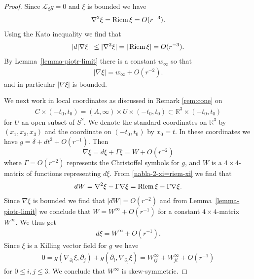 \documentclass[a4paper,11pt,reqno]{amsart}
\newcommand{\Reals}{\mathbb{R}}
\newcommand{\Riem}{\mathop{\rm Riem}}
\theoremstyle{plain}
\newcommand{\Lie}{\mathcal{L}}
\numberwithin{equation}{section}
\begin{document}
\begin{proof}

Since $\Lie_\xi g = 0$ and $\xi$ is bounded we have 
\begin{equation} \label{nabla-2-xi=riem-xi}
\nabla^2 \xi = \Riem \xi = O(r^{-3}).
\end{equation}
Using the Kato inequality we find that 
\begin{align} 
|d |\nabla \xi| | \leq |\nabla^2 \xi| = |\Riem \xi| = O(r^{-3}).
\end{align} 
By Lemma~\ref{lemma-piotr-limit} there is a constant $w_\infty$ so that
\begin{align} 
|\nabla \xi| = w_\infty + O(r^{-2}).
\end{align} 
and in particular $|\nabla \xi|$ is bounded.

We next work in local coordinates as discussed in Remark \ref{rem:cone} on 
\begin{align}
C \times (-t_0,t_0) = (A, \infty) \times U \times (-t_0,t_0)
\subset \Reals^3 \times (-t_0,t_0) 
\end{align} 
for $U$ an open subset of $S^2$. We denote the standard coordinates on $\Reals^3$ by $(x_1,x_2,x_3)$ and the coordinate on $(-t_0,t_0)$ by $x_0=t$. In these coordinates we have $g = \delta + dt^2 + O(r^{-1})$. Then 
\begin{equation} \label{nabla-xi-local}
\nabla \xi = d \xi + \Gamma \xi = W + O(r^{-2})
\end{equation}
where $\Gamma = O(r^{-2})$ represents the Christoffel symbols for $g$, and $W$ is a $4\times 4$-matrix of functions representing $d\xi$. From \eqref{nabla-2-xi=riem-xi} we find that
\begin{equation} \label{dW-equation}
dW = \nabla^2 \xi - \Gamma \nabla \xi = \Riem \xi - \Gamma \nabla \xi.
\end{equation}
Since $\nabla \xi$ is bounded we find that $|dW| = O(r^{-2})$ and from Lemma~\ref{lemma-piotr-limit} we conclude that $W = W^\infty + O(r^{-1})$ for a constant $4\times 4$-matrix $W^\infty$.
We thus get 
\begin{align}
d\xi = W^\infty + O(r^{-1}). 
\end{align}
Since $\xi$ is a Killing vector field for $g$ we have
\begin{align}
0 = g(\nabla_{\partial_i} \xi, \partial_j) + g(\partial_i, \nabla_{\partial_j} \xi) 
= W^\infty_{ij} + W^\infty_{ji} + O(r^{-1})
\end{align} 
for $0\leq i,j \leq 3$. We conclude that $W^\infty$ is skew-symmetric.


\end{proof}
\end{document}
